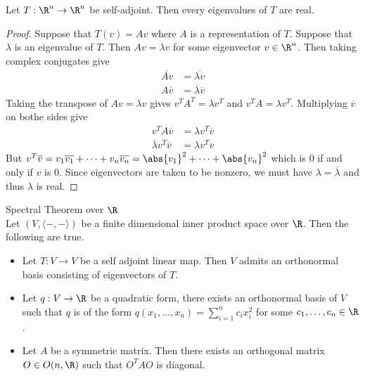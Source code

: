 \documentclass[a4paper]{article}
\begin{document}
\begin{prp}{}{} Let $T:\R^n\to\R^n$ be self-adjoint. Then every eigenvalues of $T$ are real. 
\begin{proof}
Suppose that $T(v)=Av$ where $A$ is a representation of $T$. Suppose that $\lambda$ is an eigenvalue of $T$. Then $Av=\lambda v$ for some eigenvector $v\in\R^n$. Then taking complex conjugates give 
\begin{align*}
\overline{Av}&=\overline{\lambda v}\\
A\overline{v}&=\overline{\lambda}\overline{v}
\end{align*}
Taking the transpose of $Av=\lambda v$ gives $v^TA^T=\lambda v^T$ and $v^TA=\lambda v^T$. Multiplying $\overline{v}$ on bothe sides give 
\begin{align*}
v^TA\overline{v}&=\lambda v^T\overline{v}\\
\overline{\lambda}v^T\overline{v}&=\lambda v^T\overline{v}
\end{align*}
But $v^T\overline{v}=v_1\overline{v_1}+\dots+v_n\overline{v_n}=\abs{v_1}^2+\dots+\abs{v_n}^2$ which is $0$ if and only if $v$ is $0$. Since eigenvectors are taken to be nonzero, we must have $\lambda=\overline{\lambda}$ and thus $\lambda$ is real. 
\end{proof}
\end{prp}

\begin{thm}{Spectral Theorem over $\R$}{}\\
Let $(V,\langle-,-\rangle)$ be a finite dimensional inner product space over $\R$. Then the following are true. 
\begin{itemize}
\item Let $T:V\to V$ be a self adjoint linear map. Then $V$ admits an orthonormal basis consisting of eigenvectors of $T$. 
\item Let $q:V\to\R$ be a quadratic form, there exists an orthonormal basis of $V$ such that $q$ is of the form $q(x_1,\dots,x_n)=\sum_{i=1}^nc_ix_i^2$ for some $c_1,\dots,c_n\in\R$. 
\item Let $A$ be a symmetric matrix. Then there exists an orthogonal matrix $O\in O(n,\R)$ such that $O^TAO$ is diagonal. 
\end{itemize}
\end{thm}
\end{document}
